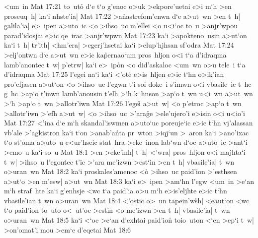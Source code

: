 <um~in\bibvsend
\vs Mat 17:21
to~uto\r{}
d`e
t`o
g'enoc
o>uk
>ekpore'uetai
e>i
m`h
>en
proseuq~h|
ka`i
nhste'ia|\bibvsend
\vs Mat 17:22
>a\r{n}astrefom'enwn
d`e
a>ut~wn
>en
t~h|
galila'ia|
e>~ipen
a>uto~ic
<o
>ihso~uc
m'ellei
<o
u<i`oc
to~u
>anjr'wpou
parad'idosjai
e>ic
qe~irac
>anjr'wpwn\bibvsend
\vs Mat 17:23
ka`i
>apokteno~usin
a>ut`on
ka`i
t~h|
tr'ith|
<hm'era|
>egerj'hsetai
ka`i
>elup'hjhsan
sf'odra\bibvsend
\vs Mat 17:24
>elj'ontwn
d`e
a>ut~wn
e>ic
ka\r{p}ernao`um
pros~hljon
o<i
t`a
d'idraqma
lamb'anontec
t~w|
p'etrw|
ka`i
e>~ip\r{o}n
<o
did'askaloc
<um~wn
o>u
tele~i
t`a
d'idraqma\bibvsend
\vs Mat 17:25
l'egei
na`i
ka`i
<'ote\r{}
e>is~hljen
e>ic
t`hn
o>ik'ian
pro'efjasen
a>ut`on
<o
>ihso~uc
l'egwn
t'i
soi
doke~i
s'imwn
o<i
vbasile~ic
t~hc
g~hc
>ap`o
t'inwn
lamb'anousin
t'elh
>`h
k~hnson
>ap`o
t~wn
u<i~wn
a>ut~wn
>`h
>ap`o
t~wn
>allotr'iwn\bibvsend
\vs Mat 17:26
l'egei\r{}
a>ut~w|
<o
p'etroc
>ap`o
t~wn
>allotr'iwn
>'efh
a>ut~w|
<o
>ihso~uc
>'ara\r{g}e
>ele'ujero'i
e>isin
o<i
u<io'i\bibvsend
\vs Mat 17:27
<'ina
d`e
m`h
skandal'iswmen
a>uto`uc
poreuje`ic
e>ic
\r{t}`hn
vj'alassan
vb'ale
>'agkistron
ka`i
t`on
>anab'a\r{n}ta
pr~wton
>iqj`un
>~aron
ka`i
>ano'ixac
t`o
st'oma
a>uto~u
e<ur'hseic
stat~hra
>eke~inon
lab`wn
d`oc
a>uto~ic
>ant`i
>emo~u
ka`i
so~u\bibvsend
\vs Mat 18:1
>en
>eke'inh|
t~h|
<'wra|
pros~hljon
o<i
majhta`i
t~w|
>ihso~u
l'egontec
t'ic
>'ara
me'izwn
>est`in
>en
t~h|
vbasile'ia|
t~wn
o>uran~wn\bibvsend
\vs Mat 18:2
ka`i
proskales'amenoc
<o\r{}
>ihso~uc
paid'ion
>'esthsen
a>ut`o
>en
m'esw|
a>ut~wn\bibvsend
\vs Mat 18:3
ka`i
e>~ipen
>am`hn
l'egw
<um~in
>e`an
m`h
straf~hte
ka`i
g'enhsje
<wc
t`a
paid'ia
o>u
m`h
e>is'eljhte
e>ic
t`hn
vbasile'ian
t~wn
o>uran~wn\bibvsend
\vs Mat 18:4
<'ostic
o>~un
tapein'w\r{s}h|
<eaut`on
<wc
t`o
paid'ion
to~uto
o<~ut'oc
>estin
<o
me'izwn
>en
t~h|
vbasile'ia|
t~wn
o>uran~wn\bibvsend
\vs Mat 18:5
ka`i
<`oc
>e`an
d'exhtai
paid'ion\r{}
toio~uton
<`en
>ep`i
t~w|
>on'omat'i
mou
>em`e
d'eqetai\bibvsend
\vs Mat 18:6
